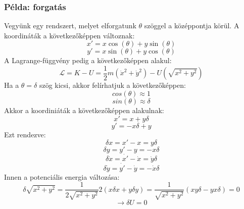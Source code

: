 \documentclass[a4paper,12pt]{article}
\begin{document}
\subsubsection*{Példa: forgatás}
Vegyünk egy rendszert, melyet elforgatunk $\theta$ szöggel a középpontja körül. A koordináták a következőképpen változnak:
\begin{equation}
    x' = x \cos(\theta) + y \sin(\theta)
\end{equation}
\begin{equation}
    y' = x \sin(\theta) + y \cos(\theta)
\end{equation}
A Lagrange-függvény pedig a következőképpen alakul:
\begin{equation}
    \mathcal{L} = K - U = \frac{1}{2}m(\dot{x}^2 + \dot{y}^2) - U(\sqrt{x^2 + y^2})
\end{equation}
Ha a $\theta = \delta$ szög kicsi, akkor felírhatjuk a következőképpen:
\begin{equation}
        cos(\theta) \approx 1
\end{equation}
\begin{equation}
        sin(\theta) \approx \delta
\end{equation}
Akkor a koordiniáták a következőképpen alakulnak:
\begin{equation}
    x' = x + y \delta
\end{equation}
\begin{equation}
    y' = -x \delta + y
\end{equation}
Ezt rendezve:
\begin{equation}
    \delta x = x' - x = y \delta
\end{equation}
\begin{equation}
    \delta y = y' - y = - x \delta
\end{equation}
\begin{equation}
    \delta \dot{x} = \dot{x'} - \dot{x} = \dot{y} \delta
\end{equation}
\begin{equation}
    \delta \dot{y} = \dot{y'} - \dot{y} = - \dot{x} \delta
\end{equation}
Innen a potenciális energia változása:
\begin{equation}
    \delta \sqrt{x^2 + y^2} = \frac{1}{2\sqrt{x^2 + y^2}} 2(x \delta x + y \delta y) = \frac{1}{\sqrt{x^2 + y^2}} (xy \delta - yx \delta) = 0
\end{equation}
\begin{equation}
    \rightarrow \delta U = 0
\end{equation}
\end{document}
